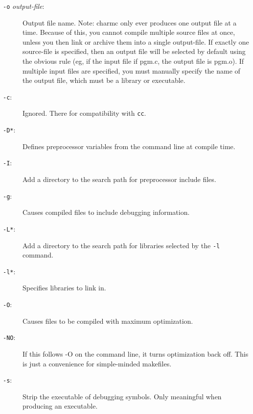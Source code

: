 \begin{description}

\item[{\tt -o} {\em output-file}:]

Output file name.  Note: charmc only ever produces one output file at
a time.  Because of this, you cannot compile multiple source files at
once, unless you then link or archive them into a single output-file.
If exactly one source-file is specified, then an output file will be
selected by default using the obvious rule (eg, if the input file if
pgm.c, the output file is pgm.o).  If multiple input files are
specified, you must manually specify the name of the output file,
which must be a library or executable.

\item[{\tt -c}:]

Ignored.  There for compatibility with {\tt cc}.

\item[{\tt -D*}:]

Defines preprocessor variables from the command line at compile time.

\item[{\tt -I}:]

Add a directory to the search path for preprocessor include files.

\item[{\tt -g}:]

Causes compiled files to include debugging information.

\item[{\tt -L*}:]

Add a directory to the search path for libraries selected by
the {\tt -l} command.

\item[{\tt -l*}:]

Specifies libraries to link in.

\item[{\tt -O}:]

Causes files to be compiled with maximum optimization.

\item[{\tt -NO}:]

If this follows -O on the command line, it turns optimization back off.
This is just a convenience for simple-minded makefiles.

\item[{\tt -s}:]

Strip the executable of debugging symbols.  Only meaningful when
producing an executable.


\end{description}
